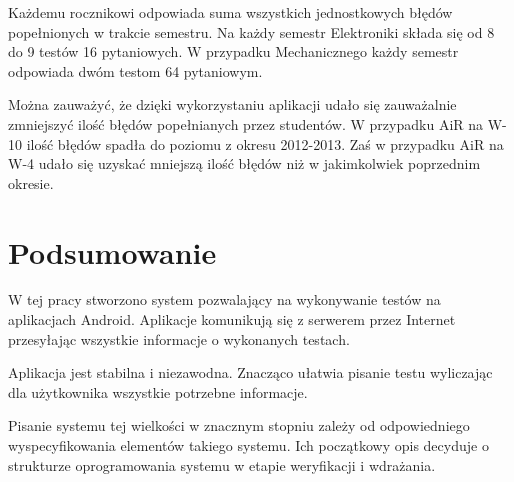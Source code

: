 \documentclass[eng]{mgr}
\begin{document}
	
		Każdemu rocznikowi odpowiada suma wszystkich jednostkowych błędów popełnionych w trakcie semestru. Na każdy semestr Elektroniki składa się od 8 do 9 testów 16 pytaniowych. W przypadku Mechanicznego każdy semestr odpowiada dwóm testom 64 pytaniowym.
		
		Można zauważyć, że dzięki wykorzystaniu aplikacji udało się zauważalnie zmniejszyć ilość błędów popełnianych przez studentów. W przypadku AiR na W-10 ilość błędów spadła do poziomu z okresu 2012-2013. Zaś w przypadku AiR na W-4 udało się uzyskać mniejszą ilość błędów niż w jakimkolwiek poprzednim okresie.
		
	\chapter{Podsumowanie}
	
	W tej pracy stworzono system pozwalający na wykonywanie testów na aplikacjach Android. Aplikacje komunikują się z serwerem przez Internet przesyłając wszystkie informacje o wykonanych testach.
	
	Aplikacja jest stabilna i niezawodna. Znacząco ułatwia pisanie testu wyliczając dla użytkownika wszystkie potrzebne informacje.
	
	Pisanie systemu tej wielkości w znacznym stopniu zależy od odpowiedniego wyspecyfikowania elementów takiego systemu. Ich początkowy opis decyduje o strukturze oprogramowania systemu w etapie weryfikacji i wdrażania.
			
	
	
			
\end{document}
